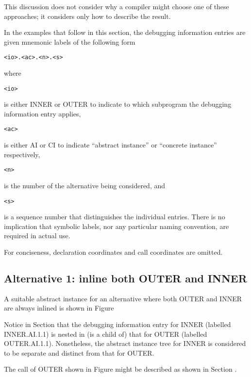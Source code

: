 This discussion does not consider why a compiler might choose
one of these approaches; it considers only how to describe
the result.

In the examples that follow in this section, the debugging
information entries are given mnemonic labels of the following
form

\begin{lstlisting}
<io>.<ac>.<n>.<s>
\end{lstlisting}

where \begin{verbatim}<io>\end{verbatim}
is either INNER or OUTER to indicate to which
subprogram the debugging information entry applies, 
\begin{verbatim}<ac>\end{verbatim}
is either AI or CI to indicate ``abstract instance'' or
``concrete instance'' respectively, 
\begin{verbatim}<n>\end{verbatim}
is the number of the
alternative being considered, and 
\begin{verbatim}<s>\end{verbatim}
is a sequence number that
distinguishes the individual entries. There is no implication
that symbolic labels, nor any particular naming convention,
are required in actual use.

For conciseness, declaration coordinates and call coordinates are omitted.

\subsection{Alternative 1: inline both OUTER and INNER}
\label{app:inlinebothouterandinner}

A suitable abstract instance for an alternative where both
OUTER and INNER are always inlined is shown in 
Figure 

Notice in 
Section  
that the debugging information entry for
INNER (labelled INNER.AI.1.1) is nested in (is a child of)
that for OUTER (labelled OUTER.AI.1.1). Nonetheless, the
abstract instance tree for INNER is considered to be separate
and distinct from that for OUTER.

The call of OUTER shown in 
Figure 
might be described as
shown in 
Section .



